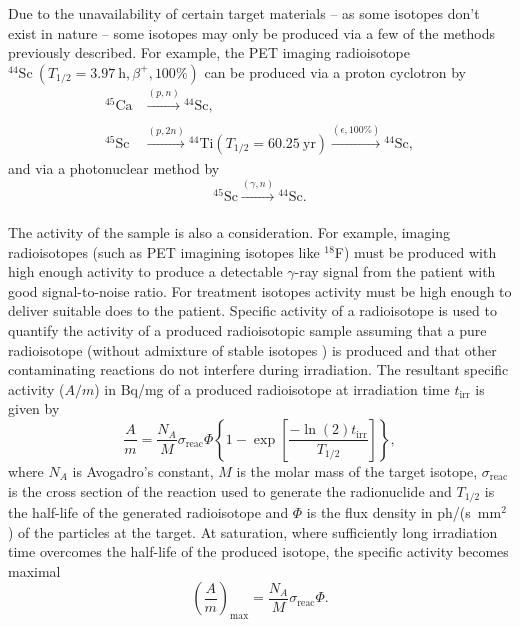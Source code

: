 \documentclass[../main.tex]{subfiles}
\begin{document}
Due to the unavailability of certain target materials -- as some isotopes don't exist in nature -- some isotopes may only be produced via a few of the methods previously described. For example, the PET imaging radioisotope $^{44}\mathrm{Sc}~\left(T_{1/2}=3.97~\si{\hour}, \beta^{+}, 100\%\right)$\cite{roesch2012scandium,muller2014promising} can be produced via a proton cyclotron by 
\begin{align}
^{45}\mathrm{Ca}&\xrightarrow[]{\left(p,n\right)}{}^{44}\mathrm{Sc},
\label{eq:44Sc_direct} \\
^{45}\mathrm{Sc}&\xrightarrow[]{\left(p,2n\right)}{}^{44}\mathrm{Ti}\left(T_{1/2}=60.25~\mathrm{yr}\right)\xrightarrow[]{\left(\epsilon, 100\%\right)}{}^{44}\mathrm{Sc},
\label{eq:44Sc_generator}
\end{align}
and via a photonuclear method by
\begin{equation}
^{45}\mathrm{Sc}\xrightarrow[]{\left(\gamma,n\right)}{}^{44}\mathrm{Sc}. \label{eq:44Sc_photonuclear}   
\end{equation}

The activity of the sample is also a consideration. For example, imaging radioisotopes (such as PET imagining isotopes like $^{18}$F) must be produced with high enough activity to produce a detectable $\gamma$-ray signal from the patient with good signal-to-noise ratio. For treatment isotopes activity must be high enough to deliver suitable does to the patient. Specific activity of a radioisotope is used to quantify the activity of a produced radioisotopic sample assuming that a pure radioisotope (without admixture of stable isotopes \cite{habs2011production}) is produced and that other contaminating reactions do not interfere during irradiation. The resultant specific activity ($A/m$) in \si{\becquerel}/\si{\milli\gram} of a produced radioisotope at irradiation time $t_{\mathrm{irr}}$ is given by \cite{habs2011production}
\begin{equation}
\frac{A}{m} = \frac{N_{A}}{M}\sigma_{\mathrm{reac}}\Phi\left\{1-\exp\left[\frac{-\ln\left(2\right)t_{\mathrm{irr}}}{T_{1/2}}\right]\right\},
\label{eq:specific_activity}    
\end{equation}
where $N_{A}$ is Avogadro's constant, $M$ is the molar mass of the target isotope, $\sigma_{\mathrm{reac}}$ is the cross section of the reaction used to generate the radionuclide and $T_{1/2}$ is the half-life of the generated radioisotope and $\Phi$ is the flux density in ph/(\si{\second}~$\mathrm{\si{\milli\meter}}^2$) of the particles at the target. At saturation, where sufficiently long irradiation time overcomes the half-life of the produced isotope, the specific activity becomes maximal
\begin{equation}
\left(\frac{A}{m}\right)_{\mathrm{max}} = \frac{N_{A}}{M}\sigma_{\mathrm{reac}}\Phi.
\label{eq:sat_specific_activity}    
\end{equation}
\end{document}

